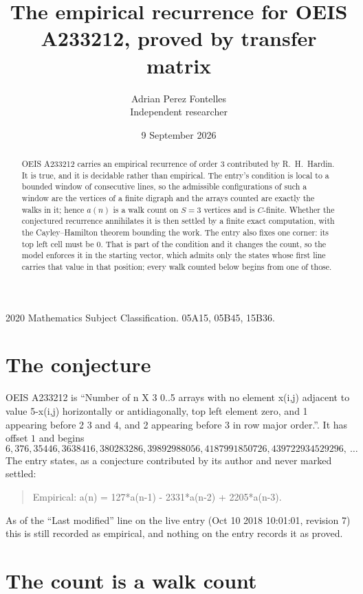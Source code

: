 \documentclass[11pt,a4paper]{article}
\title{The empirical recurrence for OEIS A233212, proved by transfer matrix}
\author{Adrian Perez Fontelles\\ \small Independent researcher}
\date{9 September 2026}
\theoremstyle{plain}
\theoremstyle{definition}
\begin{document}
\maketitle

\begin{abstract}
OEIS A233212 carries an empirical recurrence of order $3$ contributed by R.~H.~Hardin. It is
true, and it is decidable rather than empirical. The entry's condition is local to a bounded window of consecutive lines, so
the admissible configurations of such a window are the vertices of a finite digraph and the
arrays counted are exactly the walks in it; hence $a(n)$ is a walk count on $S=3$ vertices
and is $C$-finite. Whether the conjectured recurrence annihilates it is then settled by a
finite exact computation, with the Cayley--Hamilton theorem bounding the work.
 The entry also fixes one corner: its top left cell must be $0$. That is part of the condition and it changes the count, so the model enforces it in the starting vector, which admits only the states whose first line carries that value in that position; every walk counted below begins from one of those.\end{abstract}

\noindent\small 2020 Mathematics Subject Classification. 05A15, 05B45, 15B36.\normalsize

\section{The conjecture}

OEIS A233212 is ``Number of n X 3 0..5 arrays with no element x(i,j) adjacent to value 5-x(i,j) horizontally or antidiagonally, top left element zero, and 1 appearing before 2 3 and 4, and 2 appearing before 3 in row major order.''. It has offset $1$ and begins
\[
6, 376, 35446, 3638416, 380283286, 39892988056, 4187991850726, 439722934529296,\ \dots
\]
The entry states, as a conjecture contributed by its author and never marked settled:
\begin{quote}
Empirical: a(n) = 127*a(n-1) - 2331*a(n-2) + 2205*a(n-3).
\end{quote}
As of the ``Last modified'' line on the live entry (Oct 10 2018 10:01:01, revision 7) this is still
recorded as empirical, and nothing on the entry records it as proved.

\section{The count is a walk count}
\end{document}
